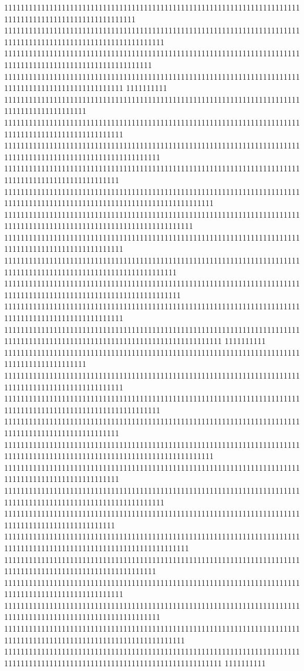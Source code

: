 11111111111111111111111111111111111111111111111111111111111111111111111111111111111111111111111111111111
111111111111111111111111111111111111111111111111111111111111111111111111111111111111111111111111111111111111111
111111111111111111111111111111111111111111111111111111111111111111111111111111111111111111111111111111111111
11111111111111111111111111111111111111111111111111111111111111111111111111111111111111111111111111111
1111111111
11111111111111111111111111111111111111111111111111111111111111111111111111111111111111111111
11111111111111111111111111111111111111111111111111111111111111111111111111111111111111111111111111111
11111111111111111111111111111111111111111111111111111111111111111111111111111111111111111111111111111111111111
1111111111111111111111111111111111111111111111111111111111111111111111111111111111111111111111111111
111111111111111111111111111111111111111111111111111111111111111111111111111111111111111111111111111111111111111111111111111
1111111111111111111111111111111111111111111111111111111111111111111111111111111111111111111111111111111111111111111111
11111111111111111111111111111111111111111111111111111111111111111111111111111111111111111111111111111
111111111111111111111111111111111111111111111111111111111111111111111111111111111111111111111111111111111111111111
1111111111111111111111111111111111111111111111111111111111111111111111111111111111111111111111111111111111111111111
11111111111111111111111111111111111111111111111111111111111111111111111111111111111111111111111111111
11111111111111111111111111111111111111111111111111111111111111111111111111111111111111111111111111111111111111111111111111111
1111111111
11111111111111111111111111111111111111111111111111111111111111111111111111111111111111111111
11111111111111111111111111111111111111111111111111111111111111111111111111111111111111111111111111111
11111111111111111111111111111111111111111111111111111111111111111111111111111111111111111111111111111111111111
1111111111111111111111111111111111111111111111111111111111111111111111111111111111111111111111111111
111111111111111111111111111111111111111111111111111111111111111111111111111111111111111111111111111111111111111111111111111
1111111111111111111111111111111111111111111111111111111111111111111111111111111111111111111111111111
111111111111111111111111111111111111111111111111111111111111111111111111111111111111111111111111111111111111111
111111111111111111111111111111111111111111111111111111111111111111111111111111111111111111111111111
111111111111111111111111111111111111111111111111111111111111111111111111111111111111111111111111111111111111111111111
1111111111111111111111111111111111111111111111111111111111111111111111111111111111111111111111111111111111111
11111111111111111111111111111111111111111111111111111111111111111111111111111111111111111111111111111
11111111111111111111111111111111111111111111111111111111111111111111111111111111111111111111111111111111111111
11111111111111111111111111111111111111111111111111111111111111111111111111111111111111111111111111111111111111111111
11111111111111111111111111111111111111111111111111111111111111111111111111111111111111111111111111111111111111111111111111111
1111111111

